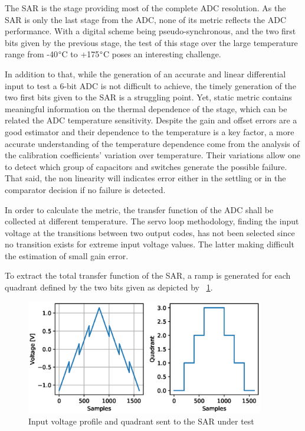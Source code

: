 The SAR is the stage providing most of the complete ADC resolution. As the SAR is only the last stage from the ADC, none of its metric reflects the ADC performance. With a digital scheme being pseudo-synchronous, and the two first bits given by the previous stage, the test of this stage over the large temperature range from -40\(\degree \)C to +175\(\degree \)C poses an interesting challenge.

In addition to that, while the generation of an accurate and linear differential input to test a 6-bit ADC is not difficult to achieve, the timely generation of the two first bits given to the SAR is a struggling point. Yet, static metric contains meaningful information on the thermal dependence of the stage, which can be related the ADC temperature sensitivity. Despite the gain and offset errors are a good estimator and their dependence to the temperature is a key factor, a more accurate understanding of the temperature dependence come from the analysis of the calibration coefficients' variation over temperature. Their variations allow one to detect which group of capacitors and switches generate the possible failure. That said, the non linearity will indicates error either in the settling or in the comparator decision if no failure is detected.

In order to calculate the metric, the transfer function of the ADC shall be collected at different temperature. The servo loop methodology, finding the input voltage at the transitions between two output codes, has not been selected since no transition exists for extreme input voltage values. The latter making difficult the estimation of small gain error.

To extract the total transfer function of the SAR, a ramp is generated for each quadrant defined by the two bits given as depicted by \figurename~\ref{fig:sar-test-input}. 

\begin{figure}[htp]
    \centering
    \includegraphics[height=5cm]{Chapter5/Figs/sar_test/sar-test-input.eps}
    \caption{Input voltage profile and quadrant sent to the SAR under test}
    \label{fig:sar-test-input}
\end{figure}


